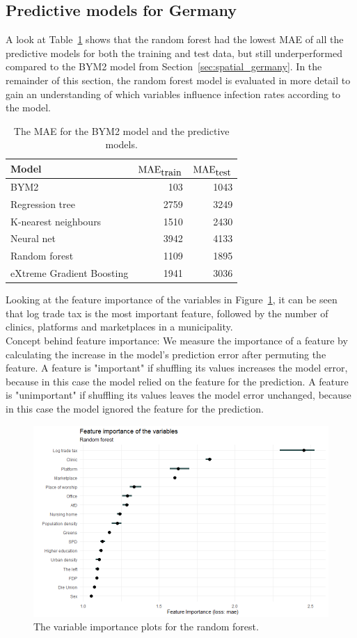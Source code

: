 \subsection{Predictive models for Germany}
A look at Table~\ref{pred_perf} shows that the random forest had the lowest MAE of all the predictive models for both the training and test data, but still underperformed compared to the BYM2 model from Section~\ref{sec:spatial_germany}. In the remainder of this section, the random forest model is evaluated in more detail to gain an understanding of which variables influence infection rates according to the model.
\begin{table}[H] 
\caption{The MAE for the BYM2 model and the predictive models. \label{pred_perf}}
\begin{tabular}{l r r}
\toprule
\textbf{Model}	& \textbf{$\hbox{MAE}_{\hbox{train}}$} & \textbf{$\hbox{MAE}_{\hbox{test}}$}\\
\midrule
BYM2 & 103 & 1043\\
Regression tree & 2759 & 3249 \\
K-nearest neighbours & 1510 & 2430 \\
Neural net & 3942 & 4133 \\
Random forest & 1109 & 1895 \\
eXtreme Gradient Boosting & 1941 & 3036 \\
\bottomrule
\end{tabular}
\end{table}
Looking at the feature importance of the variables in Figure~\ref{importance_rf_germany}, it can be seen that log trade tax is the most important feature, followed by the number of clinics, platforms and marketplaces in a municipality. \\
Concept behind feature importance:  We measure the importance of a feature by calculating the increase in the model's prediction error after permuting the feature. A feature is "important" if shuffling its values increases the model error, because in this case the model relied on the feature for the prediction. A feature is "unimportant" if shuffling its values leaves the model error unchanged, because in this case the model ignored the feature for the prediction.
\begin{figure}[H]
  \centering
  \includegraphics[width = \textwidth]{importance_rf_germany.png}
  \caption{The variable importance plots for the random forest.}
  \label{importance_rf_germany}
\end{figure}
